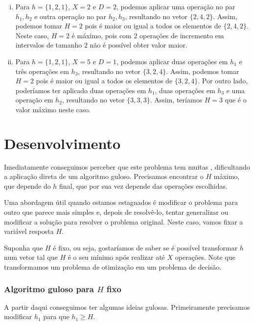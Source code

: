 \begin{enumerate}[i)]
    \item Para $h = \{1, 2, 1\}$, $X = 2$ e $D = 2$, podemos aplicar uma operação no par $h_1, h_2$ e outra operação no par $h_2, h_3$, resultando no vetor $\{2, 4, 2\}$. Assim, podemos tomar $H = 2$ pois é maior ou igual a todos os elementos de $\{2, 4, 2\}$. Neste caso, $H = 2$ é máximo, pois com $2$ operações de incremento em intervalos de tamanho $2$ não é possível obter valor maior.
    \item Para $h = \{1, 2, 1\}$, $X = 5$ e $D = 1$, podemos aplicar duas operações em $h_1$ e três operações em $h_3$, resultando no vetor $\{3, 2, 4\}$. Assim, podemos tomar $H = 2$ pois é maior ou igual a todos os elementos de $\{3, 2, 4\}$. Por outro lado, poderíamos ter aplicado duas operações em $h_1$, duas operações em $h_3$ e uma operação em $h_2$, resultando no vetor $\{3, 3, 3\}$. Assim, teríamos $H = 3$ que é o valor máximo neste caso.
\end{enumerate}

\section{Desenvolvimento}

Imediatamente conseguimos perceber que este problema tem muitas , dificultando a aplicação direta de um algoritmo guloso. Precisamos encontrar o $H$ máximo, que depende do $h$ final, que por sua vez depende das operações escolhidas.

Uma abordagem útil quando estamos estagnados é modificar o problema para outro que parece mais simples e, depois de resolvê-lo, tentar generalizar ou modificar a solução para resolver o problema original. Neste caso, vamos fixar a variável resposta $H$.

Suponha que $H$ é fixo, ou seja, gostaríamos de saber se é possível transformar $h$ num vetor tal que $H$ é o seu mínimo após realizar até $X$ operações. Note que transformamos um problema de otimização em um problema de decisão.

\subsubsection*{Algoritmo guloso para $H$ fixo}\label{subproblema:algo}

A partir daqui conseguimos ter algumas ideias gulosas. Primeiramente precisamos modificar $h_1$ para que $h_1 \geq H$.

